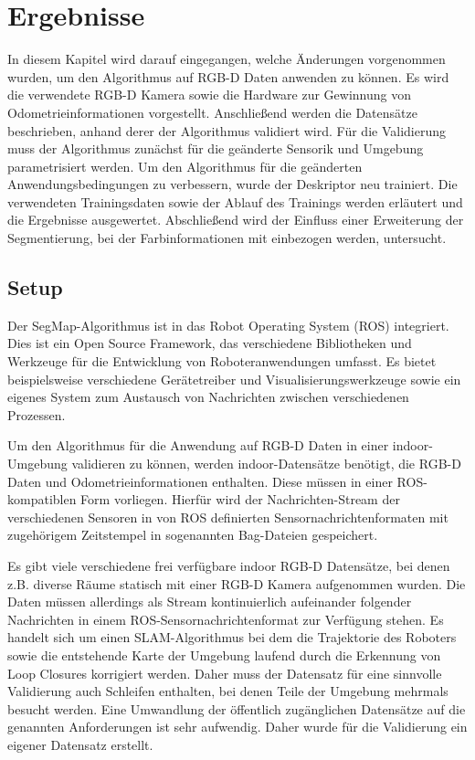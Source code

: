 \chapter{Ergebnisse}

In diesem Kapitel wird darauf eingegangen, welche Änderungen vorgenommen wurden, um den Algorithmus auf RGB-D Daten anwenden zu können. Es wird die verwendete RGB-D Kamera sowie die Hardware zur Gewinnung von Odometrieinformationen vorgestellt. Anschließend werden die Datensätze beschrieben, anhand derer der Algorithmus validiert wird. Für die Validierung muss der Algorithmus zunächst für die geänderte Sensorik und Umgebung parametrisiert werden. Um den Algorithmus für die geänderten Anwendungsbedingungen zu verbessern, wurde der Deskriptor neu trainiert. Die verwendeten Trainingsdaten sowie der Ablauf des Trainings werden erläutert und die Ergebnisse ausgewertet. Abschließend wird der Einfluss einer Erweiterung der Segmentierung, bei der Farbinformationen mit einbezogen werden, untersucht. 

\section{Setup}

Der SegMap-Algorithmus ist in das Robot Operating System (ROS) integriert. Dies ist ein Open Source Framework, das verschiedene Bibliotheken und Werkzeuge für die Entwicklung von Roboteranwendungen umfasst. Es bietet beispielsweise verschiedene Gerätetreiber und Visualisierungswerkzeuge sowie ein eigenes System zum Austausch von Nachrichten zwischen verschiedenen Prozessen.


Um den Algorithmus für die Anwendung auf RGB-D Daten in einer indoor-Umgebung validieren zu können, werden indoor-Datensätze benötigt, die RGB-D Daten und Odometrieinformationen enthalten. Diese müssen in einer ROS-kompatiblen Form vorliegen. Hierfür wird der Nachrichten-Stream der verschiedenen Sensoren in von ROS definierten Sensornachrichtenformaten mit zugehörigem Zeitstempel in sogenannten Bag-Dateien gespeichert. 

Es gibt viele verschiedene frei verfügbare indoor RGB-D Datensätze, bei denen z.B. diverse Räume statisch mit einer RGB-D Kamera aufgenommen wurden. Die Daten müssen allerdings als Stream kontinuierlich aufeinander folgender Nachrichten in einem ROS-Sensornachrichtenformat zur Verfügung stehen. Es handelt sich um einen SLAM-Algorithmus bei dem die Trajektorie des Roboters sowie die entstehende Karte der Umgebung laufend durch die Erkennung von Loop Closures korrigiert werden. Daher muss der Datensatz für eine sinnvolle Validierung auch Schleifen enthalten, bei denen Teile der Umgebung mehrmals besucht werden. Eine Umwandlung der öffentlich zugänglichen Datensätze auf die genannten Anforderungen  ist sehr aufwendig. Daher wurde für die Validierung ein eigener Datensatz erstellt. 

